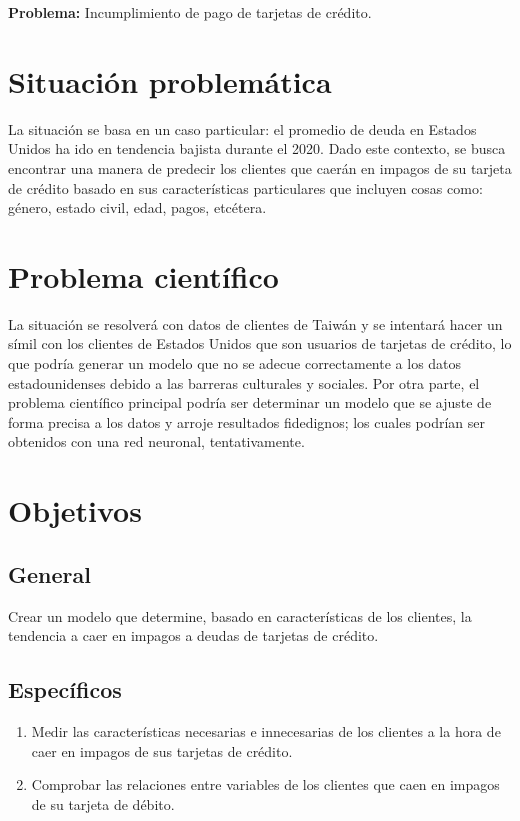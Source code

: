 




\textbf{Problema:} Incumplimiento de pago de tarjetas de crédito.
\section{Situación problemática}

La situación se basa en un caso particular: el promedio de deuda en Estados Unidos ha ido en tendencia bajista durante el 2020. Dado este contexto, se busca encontrar una manera de predecir los clientes que caerán en impagos de su tarjeta de crédito basado en sus características particulares que incluyen cosas como: género, estado civil, edad, pagos, etcétera. 
\section{Problema científico}
La situación se resolverá con datos de clientes de Taiwán y se intentará hacer un símil con los clientes de Estados Unidos que son usuarios de tarjetas de crédito, lo que podría generar un modelo que no se adecue correctamente a los datos estadounidenses debido a las barreras culturales y sociales. Por otra parte, el problema científico principal podría ser determinar un modelo que se ajuste de forma precisa a los datos y arroje resultados fidedignos; los cuales podrían ser obtenidos con una red neuronal, tentativamente. 
\section{Objetivos}
\subsection{General}
Crear un modelo que determine, basado en características de los clientes, la tendencia a caer en impagos a deudas de tarjetas de crédito.  
\subsection{Específicos}
\begin{enumerate}
	\item Medir las características necesarias e innecesarias de los clientes a la hora de caer en impagos de sus tarjetas de crédito.
	\item Comprobar las relaciones entre variables de los clientes que caen en impagos de su tarjeta de débito. 
\end{enumerate}
